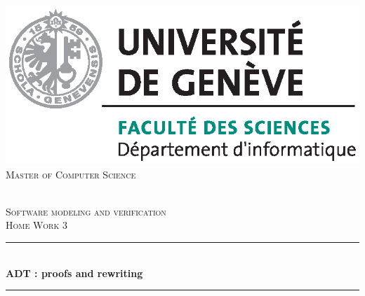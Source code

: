 
\begin{titlepage}

\newcommand{\reporttitle}{\LARGE ADT : proofs and rewriting}     %
\newcommand{\reportauthor}{Mohammad Oday \textsc{Darwich}} %
\newcommand{\reportsubject}{Software modeling and verification
\\Home Work 3}  %
\newcommand{\HRule}{\rule{\linewidth}{0.5mm}}
\setlength{\parskip}{1ex} %
\
%



\begin{center}

\begin{minipage}{\textwidth}
    \includegraphics {images/dinfo_pant.eps}\\
   \centering\textsc{\LARGE Master of Computer Science}
\end{minipage} \\[2cm]

\textsc{\Large \reportsubject}\\[1cm]
\HRule \\[1cm]
{\huge \bfseries \reporttitle}\\[0.5cm]
\HRule \\[2cm]


\end{center}
\end{titlepage}
